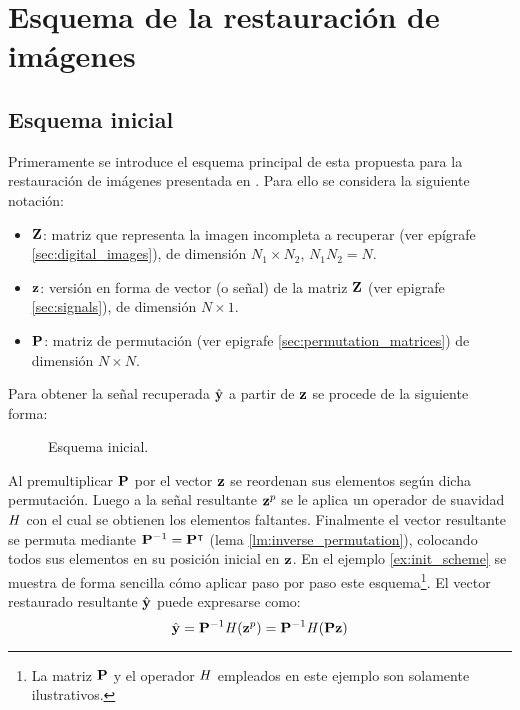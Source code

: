 \chapter{Esquema de la restauraci\'on de im\'agenes}\label{chapter:scheme}

\section{Esquema inicial}
Primeramente se introduce el esquema principal de esta propuesta para la restauraci\'on de im\'agenes presentada en \cite{ram2013image}. Para ello se considera la siguiente notaci\'on:
\begin{itemize}
	\item $\Z$: matriz que representa la imagen incompleta a recuperar (ver epígrafe \ref{sec:digital_images}), de dimensi\'on $N_1 \times N_2$, $N_1N_2 = N$.
	\item $\z$: versión en forma de vector (o señal) de la matriz $\Z$ (ver epigrafe \ref{sec:signals}), de dimensi\'on $N \times 1$.
	\item $\P$: matriz de permutaci\'on (ver epigrafe \ref{sec:permutation_matrices}) de dimensi\'on $N \times N$.
\end{itemize}
Para obtener la señal recuperada $\yhat$ a partir de $\z$ se procede de la siguiente forma:
\begin{figure}[H]
	\centering
	\caption{Esquema inicial.}
	\label{fig:init_scheme}
\end{figure}
Al premultiplicar $\P$ por el vector $\z$ se reordenan sus elementos seg\'un dicha permutaci\'on. Luego a la señal resultante $\z^p$ se le aplica un operador de suavidad $\H$ con el cual se obtienen los elementos faltantes. Finalmente el vector resultante se permuta mediante $\P^{-1}=\P^\intercal$ (lema \ref{lm:inverse_permutation}), colocando todos sus elementos en su posici\'on inicial en $\z$. En el ejemplo \ref{ex:init_scheme} se muestra de forma sencilla c\'omo aplicar paso por paso este esquema\footnote{La matriz $\P$ y el operador $\H$ empleados en este ejemplo son solamente ilustrativos.}. El vector restaurado resultante $\yhat$ puede expresarse como:
\begin{equation}
	\yhat = \P^{-1}\H(\z^p) = \P^{-1}\H(\P\z)
	\label{eq:init_yhat}
\end{equation}

